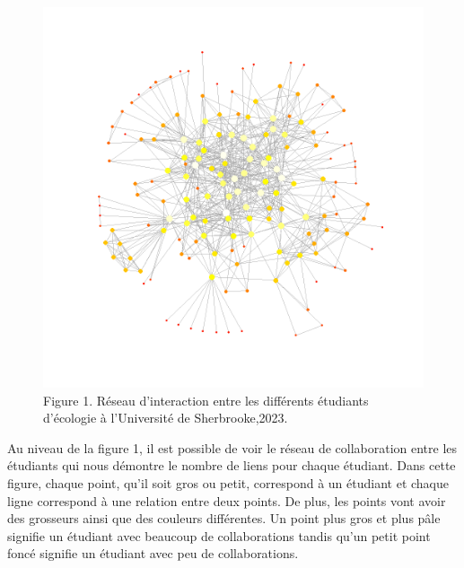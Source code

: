 \documentclass[
]{article}
\begin{document}
\begin{figure}
\centering
\includegraphics[width=5.20833in,height=\textheight]{images/visualisation.png}
\caption{Figure 1. Réseau d'interaction entre les différents étudiants
d'écologie à l'Université de Sherbrooke,2023.}
\end{figure}

Au niveau de la figure 1, il est possible de voir le réseau de
collaboration entre les étudiants qui nous démontre le nombre de liens
pour chaque étudiant. Dans cette figure, chaque point, qu'il soit gros
ou petit, correspond à un étudiant et chaque ligne correspond à une
relation entre deux points. De plus, les points vont avoir des grosseurs
ainsi que des couleurs différentes. Un point plus gros et plus pâle
signifie un étudiant avec beaucoup de collaborations tandis qu'un petit
point foncé signifie un étudiant avec peu de collaborations.
\end{document}
